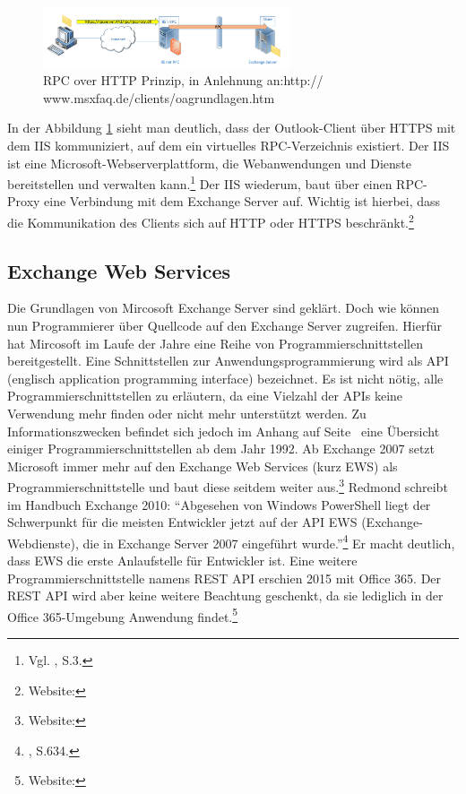 \begin{figure}[h!]
\centering
\includegraphics[width=0.65\textwidth]{Abbildungen/RPC_HTTP.png}
	\caption[RPC over HTTP Prinzip]{RPC over HTTP Prinzip,  in Anlehnung an:http://
	www.msxfaq.de/clients/oagrundlagen.htm}
	\label{fig:RPC_HTTP}
\end{figure}

\noindent
In der Abbildung \ref{fig:RPC_HTTP} sieht man deutlich, dass der Outlook-Client über HTTPS mit dem IIS kommuniziert, auf dem ein virtuelles RPC-Verzeichnis existiert. Der IIS ist eine Microsoft-Webserverplattform, die Webanwendungen und Dienste bereitstellen und verwalten kann.\footnote{Vgl. \citeauthor{Volodarsky} \citeyear{Volodarsky}, S.3.} Der IIS wiederum, baut über einen RPC-Proxy eine Verbindung mit dem Exchange Server auf. Wichtig ist hierbei, dass die Kommunikation des Clients sich auf HTTP oder HTTPS beschränkt.\footnote{Website:\cite{MSXoutlook}}


\subsection{Exchange Web Services}
\noindent
Die Grundlagen von Mircosoft Exchange Server sind geklärt. Doch wie können nun Programmierer über Quellcode auf den Exchange Server zugreifen. Hierfür hat Mircosoft im Laufe der Jahre eine Reihe von Programmierschnittstellen bereitgestellt. Eine Schnittstellen zur Anwendungsprogrammierung wird als API (englisch application programming interface) bezeichnet. Es ist nicht nötig, alle Programmierschnittstellen zu erläutern, da eine Vielzahl der APIs keine Verwendung mehr finden oder nicht mehr unterstützt werden. Zu Informationszwecken befindet sich jedoch im Anhang auf Seite~\pageref{API_1} eine Übersicht einiger Programmierschnittstellen ab dem Jahr 1992. Ab Exchange 2007 setzt Microsoft immer mehr auf den Exchange Web Services (kurz EWS) als Programmierschnittstelle und baut diese seitdem weiter aus.\footnote{Website:\cite{MSXews}}
Redmond schreibt im Handbuch Exchange 2010: 
\enquote{Abgesehen von Windows PowerShell liegt der Schwerpunkt für die meisten Entwickler jetzt auf der API EWS (Exchange-Webdienste), die in Exchange Server 2007 eingeführt wurde.}\footnote{\citeauthor{Redmond} \citeyear{Redmond}, S.634.}
Er macht deutlich, dass EWS die erste Anlaufstelle für Entwickler ist. Eine weitere Programmierschnittstelle namens REST API erschien 2015 mit Office 365. Der REST API wird aber keine weitere Beachtung geschenkt, da sie lediglich in der Office 365-Umgebung Anwendung findet.\footnote{Website:\cite{MicrosoftAPI}}


